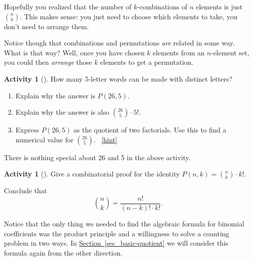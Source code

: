 \documentclass[10pt,]{book}
\theoremstyle{plain}
\theoremstyle{definition}
\theoremstyle{definition}
\theoremstyle{definition}
\newtheorem{activity}[project]{Activity}
\numberwithin{equation}{chapter}
\begin{document}
\hypertarget{p-221}{}%
Hopefully you realized that the number of \(k\)-combinations of \(n\) elements is just \(\binom{n}{k}\).  This makes sense: you just need to choose which elements to take, you don't need to arrange them.%
\par
\hypertarget{p-222}{}%
Notice though that combinations and permutations \emph{are} related in some way.  What is that way?  Well, once you have chosen \(k\) elements from an \(n\)-element set, you could then \emph{arrange} those \(k\) elements to get a permutation.%
\begin{activity}[]\label{activity-30}
\hypertarget{p-223}{}%
How many 5-letter words can be made with distinct letters?%
\begin{enumerate}[font=\bfseries,label=(\alph*),ref=\alph*]
\item\label{task-67} \hypertarget{p-224}{}%
Explain why the answer is \(P(26,5)\).%
\item\label{task-68} \hypertarget{p-225}{}%
Explain why the answer is also \(\binom{26}{5}\cdot 5!\).%
\item\label{task-69} \hypertarget{p-226}{}%
Express \(P(26,5)\) as the quotient of two factorials.  Use this to find a numerical value for \(\binom{26}{5}\).%
~\hfill{\tiny\hyperlink{a-30.c}{[hint]}\hypertarget{q-30.c}{}}\end{enumerate}
\end{activity}
\hypertarget{p-228}{}%
There is nothing special about 26 and 5 in the above activity.%
\begin{activity}[]\label{act-binomformula}
\hypertarget{p-229}{}%
Give a combinatorial proof for the identity \(P(n,k) = \binom{n}{k}\cdot k!\).%
\par
\hypertarget{p-230}{}%
Conclude that%
\begin{equation*}
\binom{n}{k} = \frac{n!}{(n-k)!\cdot k!}\text{.}
\end{equation*}
%
\end{activity}
\hypertarget{p-231}{}%
Notice that the only thing we needed to find the algebraic formula for binomial coefficients was the product principle and a willingness to solve a counting problem in two ways.  In \hyperref[sec_basic-quotient]{Section~\ref{sec_basic-quotient}} we will consider this formula again from the other direction.%
\typeout{************************************************}
\typeout{************************************************}
\end{document}
